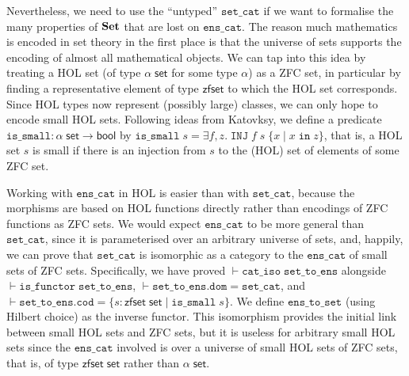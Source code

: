 \documentclass[twoside,titlepage,11pt]{article}
\begin{document}
Nevertheless, we need to use the ``untyped'' $\mathtt{set\_cat}$ if we want to formalise the many properties of $\mathbf{Set}$ that are lost on $\mathtt{ens\_cat}$.
The reason much mathematics is encoded in set theory in the first place is that the universe of sets supports the encoding of almost all mathematical objects.
We can tap into this idea by treating a HOL set (of type $\alpha\;\mathsf{set}$ for some type $\alpha$) as a ZFC set, in particular by finding a representative element of type $\mathsf{zfset}$ to which the HOL set corresponds.
Since HOL types now represent (possibly large) classes, we can only hope to encode small HOL sets.
Following ideas from Katovksy, we define a predicate $\mathtt{is\_small}:\alpha\;\mathsf{set}\to\mathsf{bool}$ by $\mathtt{is\_small}\;s=\exists{f,z}.\;\mathtt{INJ}\;f\;s\;\{x\mid x\operatorname{\mathtt{in}} z\}$, that is, a HOL set $s$ is small if there is an injection from $s$ to the (HOL) set of elements of some ZFC set.

Working with $\mathtt{ens\_cat}$ in HOL is easier than with $\mathtt{set\_cat}$, because the morphisms are based on HOL functions directly rather than encodings of ZFC functions as ZFC sets.
We would expect $\mathtt{ens\_cat}$ to be more general than $\mathtt{set\_cat}$, since it is parameterised over an arbitrary universe of sets, and, happily, we can prove that $\mathtt{set\_cat}$ is isomorphic as a category to the $\mathtt{ens\_cat}$ of small sets of ZFC sets.
Specifically, we have proved $\vdash\mathtt{cat\_iso}\;\mathtt{set\_to\_ens}$ alongside $\vdash\mathtt{is\_functor}\;\mathtt{set\_to\_ens}$, $\vdash\mathtt{set\_to\_ens}.\mathtt{dom}=\mathtt{set\_cat}$, and $\vdash\mathtt{set\_to\_ens}.\mathtt{cod}=\{s:\mathsf{zfset}\;\mathsf{set}\mid\mathtt{is\_small}\;s\}$.
We define $\mathtt{ens\_to\_set}$ (using Hilbert choice) as the inverse functor.
This isomorphism provides the initial link between small HOL sets and ZFC sets, but it is useless for arbitrary small HOL sets since the $\mathtt{ens\_cat}$ involved is over a universe of small HOL sets of ZFC sets, that is, of type $\mathsf{zfset}\;\mathsf{set}$ rather than $\alpha\;\mathsf{set}$.
\end{document}
